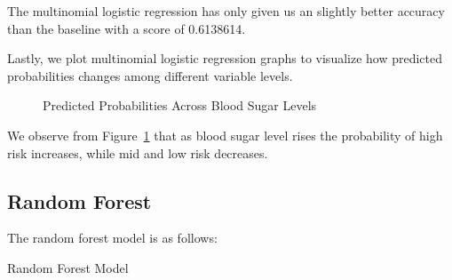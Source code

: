 \documentclass[
  letterpaper,
  DIV=11,
  numbers=noendperiod]{scrartcl}
\begin{document}
The multinomial logistic regression has only given us an slightly better
accuracy than the baseline with a score of 0.6138614.

Lastly, we plot multinomial logistic regression graphs to visualize how
predicted probabilities changes among different variable levels.

\begin{figure}


\caption{\label{fig-blood-sugar}Predicted Probabilities Across Blood
Sugar Levels}

\end{figure}%

We observe from Figure~\ref{fig-blood-sugar} that as blood sugar level
rises the probability of high risk increases, while mid and low risk
decreases.

\subsection{Random Forest}\label{random-forest}

The random forest model is as follows:

\begin{table}

\caption{\label{tbl-rf}Random Forest Model}


\end{table}%
\end{document}
